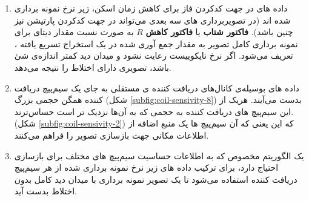 \begin{figure}[t!]
	\centering
	\hfill
	\removevspace[1]
	\caption{}
	\label{fig:coil-sensivity}
\end{figure}



\removevspace[1]
\begin{enumerate}
	\item
	داده های \kspace در جهت کدکردن فاز برای کاهش زمان اسکن، زیر نرخ نمونه برداری شده اند (در تصویربرداری های سه بعدی می‌تواند در جهت کدکردن پارتیشن نیز چنین باشد).
	\textbf{فاکتور شتاب}
	یا\textbf{ فاکتور کاهش}
	$R$ 
	به صورت نسبت مقدار دیتای \kspace برای نمونه برداری کامل تصویر به مقدار جمع آوری شده در یک استخراج تسریع یافته
	، تعریف می‌شود. اگر نرخ نایکوییست رعایت نشود و میدان دید کمتر اندازه‌ی شئ باشد، تصویری دارای اختلاط را نتیجه می‌دهد.
	
	\item
	داده های بوسیله‌ی کانال‌های دریافت کننده ی مستقلی به جای یک سیم‌پیچ دریافت کننده همگن حجمی بزرگ (شکل \ref{subfig:coil-sensivity-8}) بدست می‌آیند. هریک از این سیم‌پیچ های دریافت کننده به حجمی که به آن‌ها نزدیک تر است حساس‌ترند.(شکل \ref{subfig:coil-sensivity-2})  که این یعنی که آن سیم‌پیچ ها یک منبع اضافه از اطلاعات مکانی جهت بازسازی تصویر را فراهم می‌کنند.

	\item
	یک الگوریتم مخصوص که به اطلاعات حساسیت سیم‌پیچ های مختلف برای بازسازی احتیاج دارد، برای ترکیب داده های زیر نرخ نمونه برداری شده از هر سیم‌پیچ دریافت کننده استفاده می‌شود تا یک تصویر نمونه برداری با میدان دید کامل بدون اختلاط بدست آید.
\end{enumerate}

